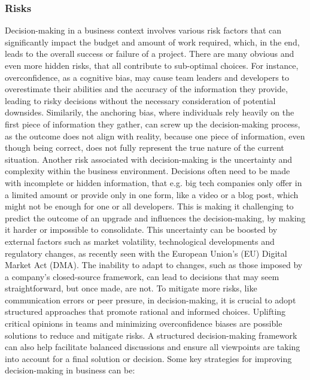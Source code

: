 \subsubsection{Risks}
Decision-making in a business context involves various risk factors that can significantly impact the budget and amount of work required, which, in the end, leads to the overall success or failure of a project. There are many obvious and even more hidden risks, that all contribute to sub-optimal choices. For instance, overconfidence, as a cognitive bias, may cause team leaders and developers to overestimate their abilities and the accuracy of the information they provide, leading to risky decisions without the necessary consideration of potential downsides. Similarily, the anchoring bias, where individuals rely heavily on the first piece of information they gather, can screw up the decision-making process, as the outcome does not align with reality, because one piece of information, even though being correct, does not fully represent the true nature of the current situation. 
\newline \noindent Another risk associated with decision-making is the uncertainty and complexity within the business environment. Decisions often need to be made with incomplete or hidden information, that e.g. big tech companies only offer in a limited amount or provide only in one form, like a video or a blog post, which might not be enough for one or all developers. This is making it challenging to predict the outcome of an upgrade and influences the decision-making, by making it harder or impossible to consolidate. This uncertainty can be boosted by external factors such as market volatility, technological developments and regulatory changes, as recently seen with the European Union's (EU) Digital Market Act (DMA). The inability to adapt to changes, such as those imposed by a company's closed-source framework, can lead to decisions that may seem straightforward, but once made, are not. 
\newline \noindent To mitigate more risks, like communication errors or peer presure, in decision-making, it is crucial to adopt structured approaches that promote rational and informed choices. Uplifting critical opinions in teams and minimizing overconfidence biases are possible solutions to reduce and mitigate risks. A structured decision-making framework can also help facilitate balanced discussions and ensure all viewpoints are taking into account for a final solution or decision. 
\newline \noindent Some key strategies for improving decision-making in business can be: 
